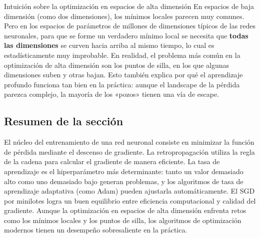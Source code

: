 \begin{knowledgebox}{Intuición sobre la optimización en espacios de alta dimensión}
En espacios de baja dimensión (como dos dimensiones), los mínimos locales parecen muy comunes. Pero en los espacios de parámetros de millones de dimensiones típicos de las redes neuronales, para que se forme un verdadero mínimo local se necesita que \textbf{todas las dimensiones} se curven hacia arriba al mismo tiempo, lo cual es estadísticamente muy improbable. En realidad, el problema más común en la optimización de alta dimensión son los puntos de silla, en los que algunas dimensiones suben y otras bajan. Esto también explica por qué el aprendizaje profundo funciona tan bien en la práctica: aunque el landscape de la pérdida parezca complejo, la mayoría de los «pozos» tienen una vía de escape.
\end{knowledgebox}

\subsection{Resumen de la sección}

El núcleo del entrenamiento de una red neuronal consiste en minimizar la función de pérdida mediante el descenso de gradiente. La retropropagación utiliza la regla de la cadena para calcular el gradiente de manera eficiente. La tasa de aprendizaje es el hiperparámetro más determinante: tanto un valor demasiado alto como uno demasiado bajo generan problemas, y los algoritmos de tasa de aprendizaje adaptativa (como Adam) pueden ajustarla automáticamente. El SGD por minilotes logra un buen equilibrio entre eficiencia computacional y calidad del gradiente. Aunque la optimización en espacios de alta dimensión enfrenta retos como los mínimos locales y los puntos de silla, los algoritmos de optimización modernos tienen un desempeño sobresaliente en la práctica.
